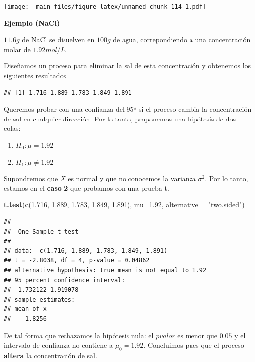\documentclass[
]{book}
\newenvironment{Shaded}{\begin{snugshade}}{\end{snugshade}}
\newcommand{\AttributeTok}[1]{\textcolor[rgb]{0.13,0.29,0.53}{#1}}
\newcommand{\FloatTok}[1]{\textcolor[rgb]{0.00,0.00,0.81}{#1}}
\newcommand{\FunctionTok}[1]{\textcolor[rgb]{0.13,0.29,0.53}{\textbf{#1}}}
\newcommand{\NormalTok}[1]{#1}
\newcommand{\StringTok}[1]{\textcolor[rgb]{0.31,0.60,0.02}{#1}}
\providecommand{\tightlist}{%
  \setlength{\itemsep}{0pt}\setlength{\parskip}{0pt}}
\begin{document}
\texttt{[image: \_main\_files/figure-latex/unnamed-chunk-114-1.pdf]}

\textbf{Ejemplo (NaCl)}

\(11.6 g\) de NaCl se disuelven en \(100 g\) de agua, correpondiendo a una concentración molar de \(1.92 mol/L\).

Diseñamos un proceso para eliminar la sal de esta concentración y obtenemos los siguientes resultados

\begin{verbatim}
## [1] 1.716 1.889 1.783 1.849 1.891
\end{verbatim}

Queremos probar con una confianza del \(95º%
\) si el proceso cambia la concentración de sal en cualquier dirección. Por lo tanto, proponemos una hipótesis de dos colas:

\begin{enumerate}
\def\labelenumi{\alph{enumi}.}
\tightlist
\item
  \(H_0:\mu=1.92\)
\item
  \(H_1:\mu\neq 1.92\)
\end{enumerate}

Supondremos que \(X\) es normal y que no conocemos la varianza \(\sigma^2\). Por lo tanto, estamos en el \textbf{caso 2} que probamos con una prueba t.

\begin{Shaded}
\begin{Highlighting}[]
\FunctionTok{t.test}\NormalTok{(}\FunctionTok{c}\NormalTok{(}\FloatTok{1.716}\NormalTok{, }\FloatTok{1.889}\NormalTok{, }\FloatTok{1.783}\NormalTok{, }\FloatTok{1.849}\NormalTok{, }\FloatTok{1.891}\NormalTok{), }
       \AttributeTok{mu=}\FloatTok{1.92}\NormalTok{, }\AttributeTok{alternative =} \StringTok{"two.sided"}\NormalTok{)}
\end{Highlighting}
\end{Shaded}

\begin{verbatim}
## 
##  One Sample t-test
## 
## data:  c(1.716, 1.889, 1.783, 1.849, 1.891)
## t = -2.8038, df = 4, p-value = 0.04862
## alternative hypothesis: true mean is not equal to 1.92
## 95 percent confidence interval:
##  1.732122 1.919078
## sample estimates:
## mean of x 
##    1.8256
\end{verbatim}

De tal forma que rechazamos la hipótesis nula: el \(pvalor\) es menor que \(0.05\) y el intervalo de confianza no contiene a \(\mu_0=1.92\). Concluimos pues que el proceso \textbf{altera} la concentración de sal.
\end{document}
